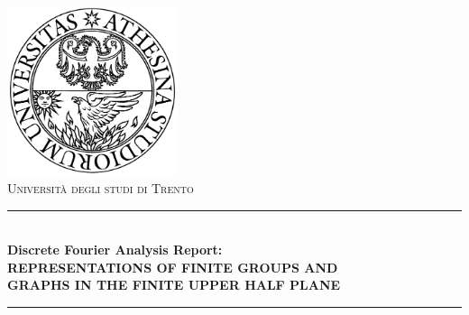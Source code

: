 \begin{titlepage}

\newcommand{\HRule}{\rule{\linewidth}{0.5mm}} %

\center %
 
\includegraphics[width = 50mm]{unitn.jpg}\\[0.5cm]
\textsc{\LARGE Università degli studi di Trento}\\[1cm] %


\HRule \\[0.4cm]
{ \Large \bfseries Discrete Fourier Analysis Report: \\REPRESENTATIONS OF FINITE GROUPS AND \\[0.3cm] GRAPHS IN THE FINITE UPPER HALF PLANE}\\[0.2cm] %
\HRule \\[1.5cm]
 



\end{titlepage}
